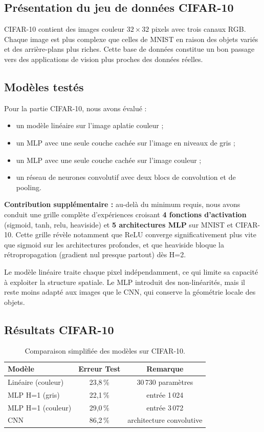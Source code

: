 \documentclass[a4paper,10pt]{article}
\begin{document}
\subsection{Présentation du jeu de données CIFAR-10}

CIFAR-10 contient des images couleur $32 \times 32$ pixels avec trois canaux RGB.
Chaque image est plus complexe que celles de MNIST en raison des objets variés et
des arrière-plans plus riches.
Cette base de données constitue un bon passage vers des applications de vision
plus proches des données réelles.

\subsection{Modèles testés}

Pour la partie CIFAR-10, nous avons évalué :
\begin{itemize}
    \item un modèle linéaire sur l'image aplatie couleur ;
    \item un MLP avec une seule couche cachée sur l'image en niveaux de gris ;
    \item un MLP avec une seule couche cachée sur l'image couleur ;
    \item un réseau de neurones convolutif avec deux blocs de convolution et de pooling.
\end{itemize}

\textbf{Contribution supplémentaire :} au-delà du minimum requis, nous avons conduit une
grille complète d'expériences croisant \textbf{4 fonctions d'activation}
(sigmoid, tanh, relu, heaviside) et \textbf{5 architectures MLP} sur MNIST et CIFAR-10.
Cette grille révèle notamment que ReLU converge significativement plus vite que sigmoid
sur les architectures profondes, et que heaviside bloque la rétropropagation
(gradient nul presque partout) dès H=2.

Le modèle linéaire traite chaque pixel indépendamment,
ce qui limite sa capacité à exploiter la structure spatiale.
Le MLP introduit des non-linéarités, mais il reste moins adapté aux images que
le CNN, qui conserve la géométrie locale des objets.

\subsection{Résultats CIFAR-10}

\begin{table}[H]
\centering
\caption{Comparaison simplifiée des modèles sur CIFAR-10.}
\begin{tabular}{lcc}
\toprule
\textbf{Modèle} & \textbf{Erreur Test} & \textbf{Remarque} \\
\midrule
Linéaire (couleur)   & 23,8\,\% & 30\,730 paramètres \\
MLP H=1 (gris)        & 22,1\,\% & entrée 1\,024 \\
MLP H=1 (couleur)     & 29,0\,\% & entrée 3\,072 \\
CNN                  & 86,2\,\% & architecture convolutive \\
\bottomrule
\end{tabular}
\label{tab:cifar_resultats}
\end{table}
\end{document}
